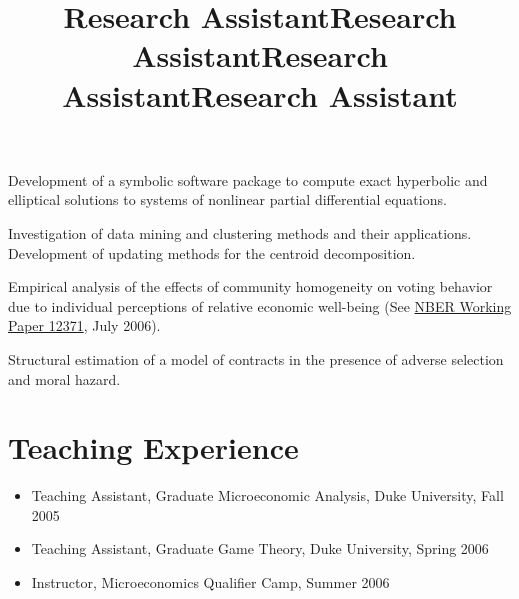 \documentclass[overlapped,line,letterpaper]{res}
\begin{document}
\begin{resume}
\title{Research Assistant}
\begin{position}
  Development of a symbolic software package to compute exact
  hyperbolic and elliptical solutions to systems of nonlinear partial
  differential equations.
\end{position}

\title{Research Assistant}
\begin{position}
  Investigation of data mining and clustering methods and their
  applications. Development of updating methods for the centroid
  decomposition.
\end{position}

\title{Research Assistant}
\begin{position}
  Empirical analysis of the effects of community homogeneity on voting
  behavior due to individual perceptions of relative economic
  well-being
  (See \href{http://www.nber.org/papers/w12371}{NBER Working Paper 12371},
  July 2006).
\end{position}

\title{Research Assistant}
\begin{position}
  Structural estimation of a model of contracts in the presence of
  adverse selection and moral hazard.
\end{position}


\section{\bf Teaching Experience}

\begin{itemize}
\item Teaching Assistant, Graduate Microeconomic Analysis, Duke
  University, Fall 2005
\item Teaching Assistant, Graduate Game Theory, Duke University, Spring 2006
\item Instructor, Microeconomics Qualifier Camp, Summer 2006
\end{itemize}


\end{resume}
\end{document}
